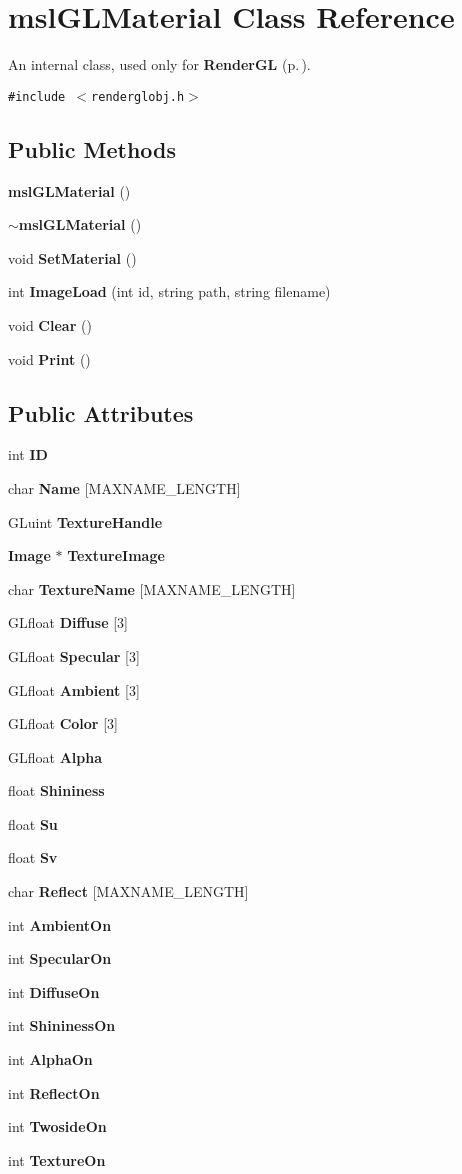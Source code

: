 \section{msl\-GLMaterial  Class Reference}
\label{classmslGLMaterial}
An internal class, used only for {\bf Render\-GL} {\rm (p.\,\pageref{classRenderGL})}. 


{\tt \#include $<$renderglobj.h$>$}

\subsection*{Public Methods}
\begin{CompactItemize}
\item 
{\bf msl\-GLMaterial} ()
\item 
{\bf $\sim$msl\-GLMaterial} ()
\item 
void {\bf Set\-Material} ()
\item 
int {\bf Image\-Load} (int id, string path, string filename)
\item 
void {\bf Clear} ()
\item 
void {\bf Print} ()
\end{CompactItemize}
\subsection*{Public Attributes}
\begin{CompactItemize}
\item 
int {\bf ID}
\item 
char {\bf Name} [MAXNAME\_\-LENGTH]
\item 
GLuint {\bf Texture\-Handle}
\item 
{\bf Image} $\ast$ {\bf Texture\-Image}
\item 
char {\bf Texture\-Name} [MAXNAME\_\-LENGTH]
\item 
GLfloat {\bf Diffuse} [3]
\item 
GLfloat {\bf Specular} [3]
\item 
GLfloat {\bf Ambient} [3]
\item 
GLfloat {\bf Color} [3]
\item 
GLfloat {\bf Alpha}
\item 
float {\bf Shininess}
\item 
float {\bf Su}
\item 
float {\bf Sv}
\item 
char {\bf Reflect} [MAXNAME\_\-LENGTH]
\item 
int {\bf Ambient\-On}
\item 
int {\bf Specular\-On}
\item 
int {\bf Diffuse\-On}
\item 
int {\bf Shininess\-On}
\item 
int {\bf Alpha\-On}
\item 
int {\bf Reflect\-On}
\item 
int {\bf Twoside\-On}
\item 
int {\bf Texture\-On}
\end{CompactItemize}


